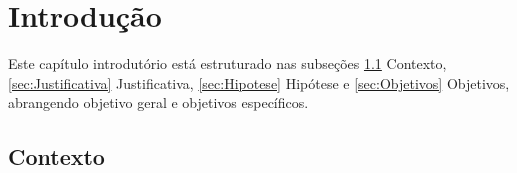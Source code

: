 \documentclass[
    12pt,                %
    openright,           %
    oneside,             %
    a4paper,             %
    english,             %
    brazil               %
]{abntex2}
\begin{document}
\textual

\chapter{Introdução}
\label{cap:introducao}

Este capítulo introdutório está estruturado nas subseções \ref{sec:Contexto} Contexto, \ref{sec:Justificativa} Justificativa, \ref{sec:Hipotese} Hipótese e \ref{sec:Objetivos} Objetivos, abrangendo objetivo geral e objetivos específicos.


\section{Contexto}
\label{sec:Contexto}
\end{document}
